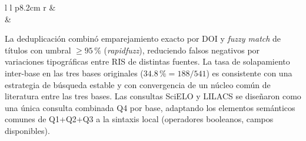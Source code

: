 \begin{table}[H]
\begin{tabular}{l l p{8.2cm} r}
\midrule
{} & \textbf{\NTotalAmpliado} \\
 & \textbf{\NUnicosAmpliado} \\
\bottomrule
\end{tabular}
\begin{Nota}[Nota]{\linewidth}{La deduplicación combinó emparejamiento
exacto por DOI y \textit{fuzzy match} de títulos con umbral $\geq 95\,\%$
(\textit{rapidfuzz}), reduciendo falsos negativos por variaciones
tipográficas entre RIS de distintas fuentes. La tasa de solapamiento
inter-base en las tres bases originales ($34.8\,\%=188/541$) es consistente
con una estrategia de búsqueda estable y con convergencia de un núcleo
común de literatura entre las tres bases. Las consultas SciELO y LILACS
se diseñaron como una única consulta combinada Q4 por base, adaptando los
elementos semánticos comunes de Q1+Q2+Q3 a la sintaxis local (operadores
booleanos, campos disponibles).}
\end{Nota}
\end{table}

\newpage

